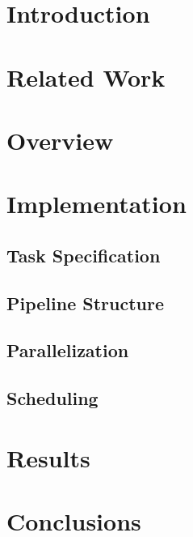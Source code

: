 \documentclass[letterpaper, 10 pt, conference]{ieeeconf}  %
\begin{document}
\section{Introduction}

\section{Related Work}

\section{Overview}
\section{Implementation}
\subsection{Task Specification}
\subsection{Pipeline Structure}

\subsection{Parallelization}

\subsection{Scheduling}

\section{Results}

\section{Conclusions}


\end{document}
